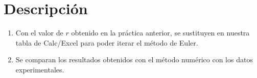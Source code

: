 \section{Descripción}

\begin{enumerate}
    \item Con el valor de $r$ obtenido en la práctica anterior,
        se sustituyen en nuestra tabla de Calc/Excel para poder
        iterar el método de Euler.
    \item Se comparan los resultados obtenidos con el método
        numérico con los datos experimentales.
\end{enumerate}
